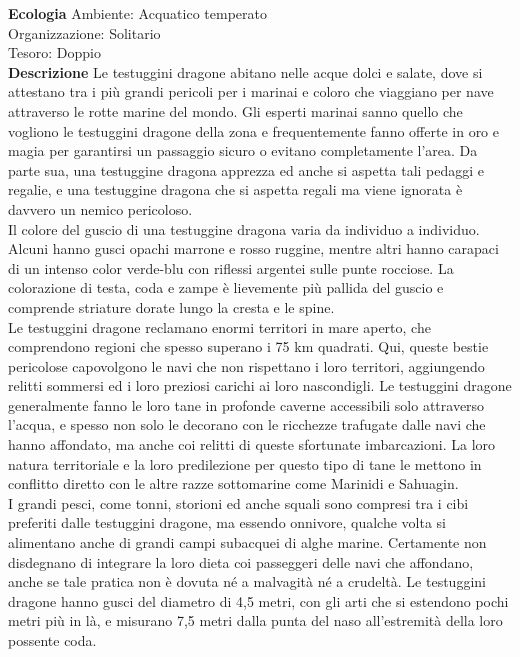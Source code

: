 \begin{multicols}{2}
\textbf{Ecologia}
Ambiente: Acquatico temperato\\
Organizzazione: Solitario\\
Tesoro: Doppio\\
\textbf{Descrizione}
Le testuggini dragone abitano nelle acque dolci e salate, dove si attestano tra i più grandi pericoli per i marinai e coloro che viaggiano per nave attraverso le rotte marine del mondo. Gli esperti marinai sanno quello che vogliono le testuggini dragone della zona e frequentemente fanno offerte in oro e magia per garantirsi un passaggio sicuro o evitano completamente l'area. Da parte sua, una testuggine dragona apprezza ed anche si aspetta tali pedaggi e regalie, e una testuggine dragona che si aspetta regali ma viene ignorata è davvero un nemico pericoloso.\\

Il colore del guscio di una testuggine dragona varia da individuo a individuo. Alcuni hanno gusci opachi marrone e rosso ruggine, mentre altri hanno carapaci di un intenso color verde-blu con riflessi argentei sulle punte rocciose. La colorazione di testa, coda e zampe è lievemente più pallida del guscio e comprende striature dorate lungo la cresta e le spine.\\
Le testuggini dragone reclamano enormi territori in mare aperto, che comprendono regioni che spesso superano i 75 km quadrati. Qui, queste bestie pericolose capovolgono le navi che non rispettano i loro territori, aggiungendo relitti sommersi ed i loro preziosi carichi ai loro nascondigli. Le testuggini dragone generalmente fanno le loro tane in profonde caverne accessibili solo attraverso l'acqua, e spesso non solo le decorano con le ricchezze trafugate dalle navi che hanno affondato, ma anche coi relitti di queste sfortunate imbarcazioni. La loro natura territoriale e la loro predilezione per questo tipo di tane le mettono in conflitto diretto con le altre razze sottomarine come Marinidi e Sahuagin.\\

I grandi pesci, come tonni, storioni ed anche squali sono compresi tra i cibi preferiti dalle testuggini dragone, ma essendo onnivore, qualche volta si alimentano anche di grandi campi subacquei di alghe marine. Certamente non disdegnano di integrare la loro dieta coi passeggeri delle navi che affondano, anche se tale pratica non è dovuta né a malvagità né a crudeltà. Le testuggini dragone hanno gusci del diametro di 4,5 metri, con gli arti che si estendono pochi metri più in là, e misurano 7,5 metri dalla punta del naso all'estremità della loro possente coda.\\


\end{multicols}
